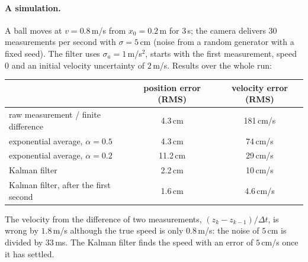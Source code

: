 \paragraph{A simulation.} A ball moves at $v=0.8$\,m/s from $x_0=0.2$\,m for $3$\,s; the camera delivers $30$ measurements per second with $\sigma=5$\,cm (noise from a random generator with a fixed seed). The filter uses $\sigma_a=1$\,m/s$^2$, starts with the first measurement, speed $0$ and an initial velocity uncertainty of $2$\,m/s. Results over the whole run:
\begin{center}\small
\begin{tabular}{l c c}
\hline
 & position error (RMS) & velocity error (RMS)\\\hline
raw measurement / finite difference & 4.3\,cm & 181\,cm/s\\
exponential average, $\alpha=0.5$ & 4.3\,cm & 74\,cm/s\\
exponential average, $\alpha=0.2$ & 11.2\,cm & 29\,cm/s\\
Kalman filter & 2.2\,cm & 10\,cm/s\\
Kalman filter, after the first second & 1.6\,cm & 4.6\,cm/s\\\hline
\end{tabular}
\end{center}
The velocity from the difference of two measurements, $(z_k-z_{k-1})/\Delta t$, is wrong by $1.8$\,m/s although the true speed is only $0.8$\,m/s: the noise of $5$\,cm is divided by $33$\,ms. The Kalman filter finds the speed with an error of $5$\,cm/s once it has settled.

\begin{center}
\end{center}

